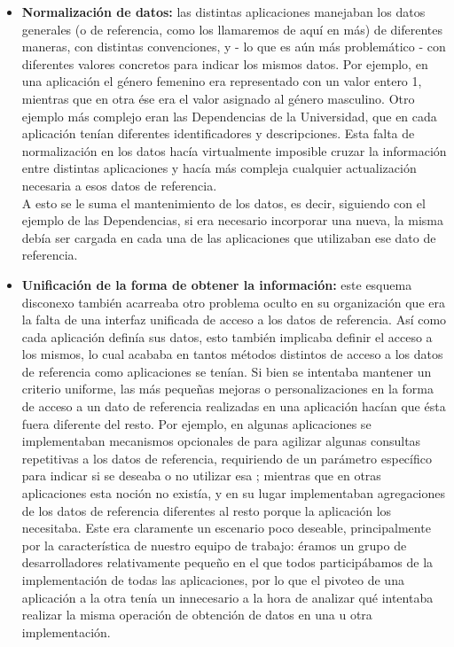 \begin{itemize}
  \item \textbf{Normalización de datos:} las distintas aplicaciones manejaban los datos generales (o de referencia, como los llamaremos de aquí en más) de diferentes maneras, con distintas convenciones, y - lo que es aún más problemático - con diferentes valores concretos para indicar los mismos datos. Por ejemplo, en una aplicación el género femenino era representado con un valor entero 1, mientras que en otra ése era el valor asignado al género masculino. Otro ejemplo más complejo eran las Dependencias de la Universidad, que en cada aplicación tenían diferentes identificadores y descripciones. Esta falta de normalización en los datos hacía virtualmente imposible cruzar la información entre distintas aplicaciones y hacía más compleja cualquier actualización necesaria a esos datos de referencia.\\
  A esto se le suma el mantenimiento de los datos, es decir, siguiendo con el ejemplo de las Dependencias, si era necesario incorporar una nueva, la misma debía ser cargada en cada una de las aplicaciones que utilizaban ese dato de referencia.

  \item \textbf{Unificación de la forma de obtener la información:} este esquema disconexo también acarreaba otro problema oculto en su organización que era la falta de una interfaz unificada de acceso a los datos de referencia. Así como cada aplicación definía sus datos, esto también implicaba definir el acceso a los mismos, lo cual acababa en tantos métodos distintos de acceso a los datos de referencia como aplicaciones se tenían. Si bien se intentaba mantener un criterio uniforme, las más pequeñas mejoras o personalizaciones en la forma de acceso a un dato de referencia realizadas en una aplicación hacían que ésta fuera diferente del resto. Por ejemplo, en algunas aplicaciones se implementaban mecanismos opcionales de  para agilizar algunas consultas repetitivas a los datos de referencia, requiriendo de un parámetro específico para indicar si se deseaba o no utilizar esa ; mientras que en otras aplicaciones esta noción no existía, y en su lugar implementaban agregaciones de los datos de referencia diferentes al resto porque la aplicación los necesitaba. Este era claramente un escenario poco deseable, principalmente por la característica de nuestro equipo de trabajo: éramos un grupo de desarrolladores relativamente pequeño en el que todos participábamos de la implementación de todas las aplicaciones, por lo que el pivoteo de una aplicación a la otra tenía un  innecesario a la hora de analizar qué intentaba realizar la misma operación de obtención de datos en una u otra implementación.


\end{itemize}
